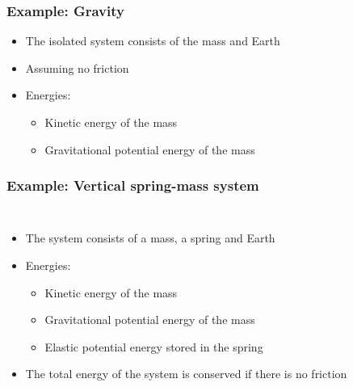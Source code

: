 \documentclass[12pt,compress,aspectratio=169]{beamer}
\newcommand{\mb}[1]{\ensuremath\mathbf{#1}}
\begin{document}
\begin{frame}
  \frametitle{Example: Gravity}

  \begin{center}
  \end{center}
  
  \begin{itemize}
  \item The isolated system consists of the mass and Earth
  \item Assuming no friction
  \item Energies:
    \begin{itemize}
    \item Kinetic energy of the mass
    \item Gravitational potential energy of the mass
    \end{itemize}
  \end{itemize}
\end{frame}


\begin{frame}
  \frametitle{Example: Vertical spring-mass system}

  \begin{columns}
    \begin{itemize}
    \item The system consists of a mass, a spring and Earth
    \item Energies:
      \begin{itemize}
      \item Kinetic energy of the mass
      \item Gravitational potential energy of the mass
      \item Elastic potential energy stored in the spring
      \end{itemize}
    \item The total energy of the system is conserved if there is no friction
    \end{itemize}
  \end{columns}
\end{frame}
\end{document}
